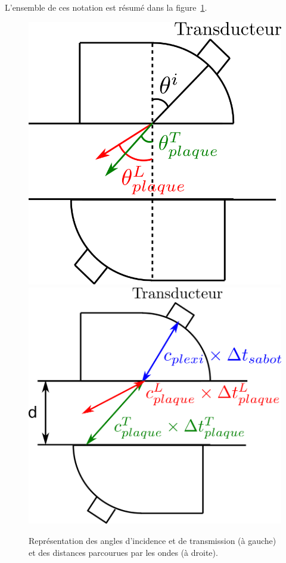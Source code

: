 \documentclass[twoside]{article}
\begin{document}
\begin{multicols}{2}
L'ensemble de ces notation est résumé dans la figure~\ref{notations}.

\begin{figure}[H]
	\centering
	\includegraphics[scale=0.23]{notations/dessin.png}
	\includegraphics[scale=0.23]{notations/dessin2.png}
	\caption{\label{notations}Représentation des angles d'incidence et de transmission (à gauche) et des distances parcourues par les ondes (à droite).}
\end{figure}


\end{multicols}
\end{document}
